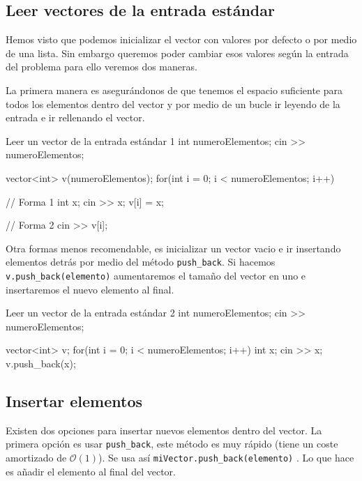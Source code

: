 \documentclass{article}
\begin{document}
    \subsection{Leer vectores de la entrada estándar}

    Hemos visto que podemos inicializar el vector con valores por defecto o por medio de una lista. Sin embargo queremos
    poder cambiar esos valores según la entrada del problema para ello veremos dos maneras.

    La primera manera es asegurándonos de que tenemos el espacio suficiente para todos los elementos dentro del vector
    y por medio de un bucle ir leyendo de la entrada e ir rellenando el vector.

    \begin{codelisting}{Leer un vector de la entrada estándar 1}
int numeroElementos;
cin >> numeroElementos;

vector<int> v(numeroElementos);
for(int i = 0; i < numeroElementos; i++) {
    // Forma 1
    int x; 
    cin >> x; 
    v[i] = x;

    // Forma 2
    cin >> v[i];
}
    \end{codelisting}

    Otra formas menos recomendable, es inicializar un vector vacio e ir insertando elementos detrás por medio del método
    \texttt{push\_back}. Si hacemos \texttt{v.push\_back(elemento)} aumentaremos el tamaño del vector en uno e 
    insertaremos el nuevo elemento al final.

    \begin{codelisting}{Leer un vector de la entrada estándar 2}
    int numeroElementos;
    cin >> numeroElementos;
    
    vector<int> v;
    for(int i = 0; i < numeroElementos; i++) {
        int x; 
        cin >> x; 
        v.push_back(x);
    }
    \end{codelisting}

    \subsection{Insertar elementos}

    Existen dos opciones para insertar nuevos elementos dentro del vector. La primera opción es usar \texttt{push\_back},
    este método es muy rápido (tiene un coste amortizado de $\mathcal{O}(1)$). Se usa así \texttt{miVector.push\_back(elemento)} . Lo que hace es añadir el elemento al final 
    del vector. 
    
\end{document}
